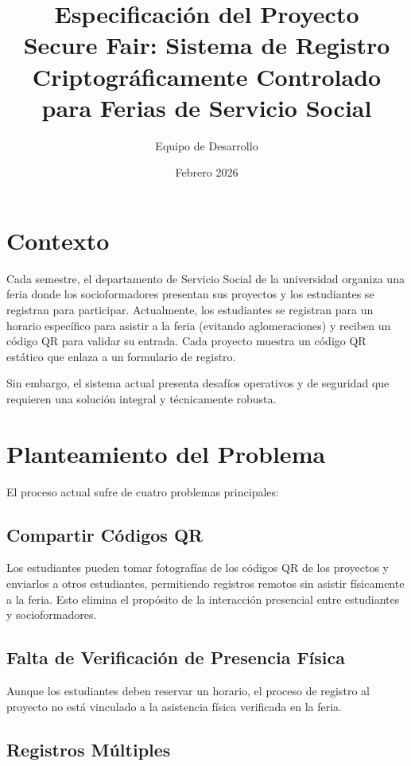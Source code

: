 \documentclass[12pt,a4paper]{article}
\title{\textbf{Especificación del Proyecto}\\
\large Secure Fair: Sistema de Registro Criptográficamente Controlado para Ferias de Servicio Social}
\author{Equipo de Desarrollo}
\date{Febrero 2026}
\begin{document}
\maketitle
\newpage

\tableofcontents
\newpage

\section{Contexto}

Cada semestre, el departamento de Servicio Social de la universidad organiza una feria donde los socioformadores presentan sus proyectos y los estudiantes se registran para participar. Actualmente, los estudiantes se registran para un horario específico para asistir a la feria (evitando aglomeraciones) y reciben un código QR para validar su entrada. Cada proyecto muestra un código QR estático que enlaza a un formulario de registro.

Sin embargo, el sistema actual presenta desafíos operativos y de seguridad que requieren una solución integral y técnicamente robusta.

\section{Planteamiento del Problema}

El proceso actual sufre de cuatro problemas principales:

\subsection{Compartir Códigos QR}

Los estudiantes pueden tomar fotografías de los códigos QR de los proyectos y enviarlos a otros estudiantes, permitiendo registros remotos sin asistir físicamente a la feria. Esto elimina el propósito de la interacción presencial entre estudiantes y socioformadores.

\subsection{Falta de Verificación de Presencia Física}

Aunque los estudiantes deben reservar un horario, el proceso de registro al proyecto no está vinculado a la asistencia física verificada en la feria.

\subsection{Registros Múltiples}
\end{document}
